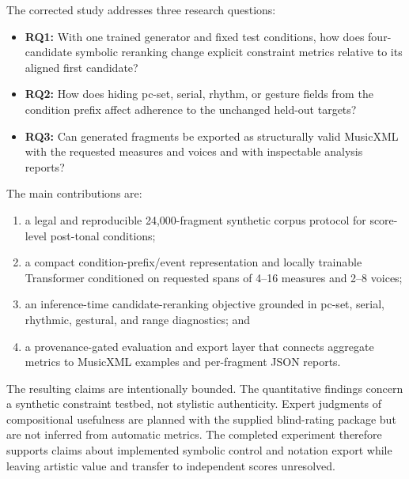 The corrected study addresses three research questions:
\begin{itemize}
  \item \textbf{RQ1:} With one trained generator and fixed test conditions, how does four-candidate symbolic reranking change explicit constraint metrics relative to its aligned first candidate?
  \item \textbf{RQ2:} How does hiding pc-set, serial, rhythm, or gesture fields from the condition prefix affect adherence to the unchanged held-out targets?
  \item \textbf{RQ3:} Can generated fragments be exported as structurally valid MusicXML with the requested measures and voices and with inspectable analysis reports?
\end{itemize}

The main contributions are:
\begin{enumerate}
  \item a legal and reproducible 24,000-fragment synthetic corpus protocol for score-level post-tonal conditions;
  \item a compact condition-prefix/event representation and locally trainable Transformer conditioned on requested spans of 4--16 measures and 2--8 voices;
  \item an inference-time candidate-reranking objective grounded in pc-set, serial, rhythmic, gestural, and range diagnostics; and
  \item a provenance-gated evaluation and export layer that connects aggregate metrics to MusicXML examples and per-fragment JSON reports.
\end{enumerate}

The resulting claims are intentionally bounded. The quantitative findings concern a synthetic constraint testbed, not stylistic authenticity. Expert judgments of compositional usefulness are planned with the supplied blind-rating package but are not inferred from automatic metrics. The completed experiment therefore supports claims about implemented symbolic control and notation export while leaving artistic value and transfer to independent scores unresolved.
